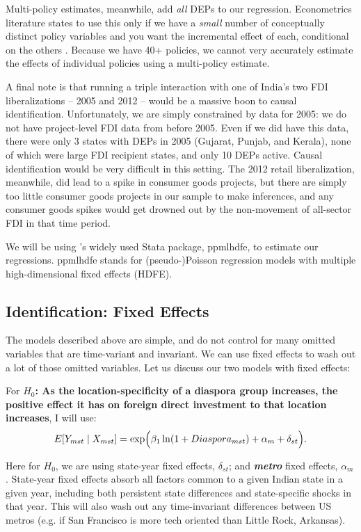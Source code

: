 \documentclass[12pt]{article}
\let\oldsubsection\subsection
\renewcommand{\subsection}{\FloatBarrier\oldsubsection}
\begin{document}
Multi-policy estimates, meanwhile, add \textit{all} DEPs to our regression. Econometrics literature states to use this only if we have a \textit{small} number of conceptually distinct policy variables and you want the incremental effect of each, conditional on the others \citep{yotov_advanced_nodate}. Because we have 40+ policies, we cannot very accurately estimate the effects of individual policies using a multi-policy estimate. 

A final note is that running a triple interaction with one of India's two FDI liberalizations -- 2005 and 2012 -- would be a massive boon to causal identification. Unfortunately, we are simply constrained by data for 2005: we do not have project-level FDI data from before 2005. Even if we did have this data, there were only 3 states with DEPs in 2005 (Gujarat, Punjab, and Kerala), none of which were large FDI recipient states, and only 10 DEPs active. Causal identification would be very difficult in this setting. The 2012 retail liberalization, meanwhile, did lead to a spike in consumer goods projects, but there are simply too little consumer goods projects in our sample to make inferences, and any consumer goods spikes would get drowned out by the non-movement of all-sector FDI in that time period.

We will be using \citet{correia_fast_2020}'s widely used Stata package, ppmlhdfe, to estimate our regressions. ppmlhdfe stands for (pseudo-)Poisson regression models with multiple high-dimensional fixed effects (HDFE).

\subsection{Identification: Fixed Effects}

The models described above are simple, and do not control for many omitted variables that are time-variant and invariant. We can use fixed effects to wash out a lot of those omitted variables. Let us discuss our two models with fixed effects:

For \textbf{$H_0$:  As the location-specificity of a diaspora group increases, the positive effect it has on foreign direct investment to that location increases}, I will use:
\[
E[Y_{mst} \mid X_{mst}] =
\exp \Bigl(
\beta_1 \ln(1+Diaspora_{mst})
+ \alpha_{m}
+ \delta_{st}
\Bigr).
\]

Here for $H_0$, we are using state-year fixed effects, $\delta_{st}$; and \textbf{\textit{metro}} fixed effects, $\alpha_{m}$. State-year fixed effects absorb all factors common to a given Indian state in a given year, including both persistent state differences and state-specific shocks in that year. This will also wash out any time-invariant differences between US metros (e.g. if San Francisco is more tech oriented than Little Rock, Arkansas).
\end{document}
